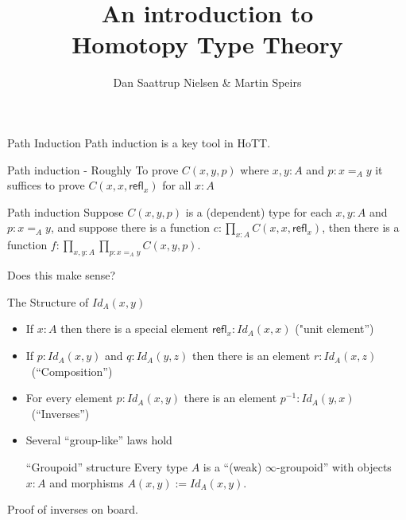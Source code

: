 \documentclass{beamer}
\title[Homotopy Type Theory]{
	An introduction to\\
	Homotopy Type Theory\\
}
\author{Dan Saattrup Nielsen \& Martin Speirs}
\date{}
\newcommand{\refl}{\mathsf{refl}}
\begin{document}


\begin{frame}{Path Induction}
Path induction is a key tool in HoTT.

\pause\begin{block}{Path induction - Roughly}
To prove $C(x,y,p)$ where $x,y : A$ and $p : x =_A y$ it suffices to prove $C(x,x,\refl_x)$ for all $x : A$
\end{block}

\pause\begin{block}{Path induction}
Suppose $C(x,y,p)$ is a (dependent) type for each $x,y : A$ and $p : x =_A y$, and suppose there is a function $c : \prod_{x : A} C(x,x,\refl_x)$, \pause then there is a function $f : \prod_{x,y : A} \prod_{p : x =_A y} C(x,y,p)$.
\end{block}

\pause Does this make sense?
\end{frame}


\begin{frame}{The Structure of $Id_A(x,y)$}
	\begin{itemize}
	\pause\item If $x : A$ then there is a special element $\refl_x : Id_A(x,x)$ ("unit element'')
	\pause\item  If $p : Id_A(x,y)$ and $q : Id_A(y,z)$ then there is an element $r : Id_A(x,z)$\  (``Composition'')
	\pause\item  For every element $p : Id_A(x,y)$ there is an element $p^{-1} : Id_A(y,x)$ \  (``Inverses'')
	\pause\item Several ``group-like'' laws hold
	\pause\begin{block}{``Groupoid'' structure}
		Every type $A$ is a ``(weak) $\infty$-groupoid'' with objects $x : A$ and morphisms $A(x,y) := Id_A(x,y)$.
	\end{block}
	\end{itemize}
	\pause Proof of inverses on board.
\end{frame}
\end{document}
